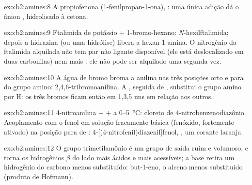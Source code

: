 \begin{solution}{exo:b2:amines:8}
A propiofenona (1-fenilpropan-1-ona), : uma única adição dá o ânion ,
hidrolisado à cetona.
\end{solution}

\begin{solution}{exo:b2:amines:9}
Ftalimida de potássio + 1-bromo-hexano: \textit{N}-hexilftalimida; depois a hidrazina (ou uma
hidrólise) libera a hexan-1-amina. O nitrogênio da ftalimida alquilada não tem par não ligante
disponível (ele está deslocalizado em duas carbonilas) nem mais : ele não pode ser
alquilado uma segunda vez.
\end{solution}

\begin{solution}{exo:b2:amines:10}
A água de bromo broma a anilina nas três posições orto e para do grupo
amino: 2,4,6-tribromoanilina. A , seguida de , substitui o grupo amino por H: os três
bromos ficam então em 1,3,5 uns em relação aos outros.
\end{solution}

\begin{solution}{exo:b2:amines:11}
4-nitroanilina +  +  a 0--\qty{5}{\degreeCelsius}: cloreto de
4-nitrobenzenodiazônio. Acoplamento com o fenol em solução fracamente básica (fenóxido, fortemente
ativado) na posição para de : 4-[(4-nitrofenil)diazenil]fenol, , um
corante laranja.
\end{solution}

\begin{solution}{exo:b2:amines:12}
O grupo trimetilamônio é um grupo de saída ruim e volumoso, e torna os hidrogênios $\beta$ do
lado  mais ácidos e mais acessíveis; a base retira um hidrogênio do carbono menos
substituído: but-1-eno, o alceno menos substituído (produto de Hofmann).
\end{solution}

